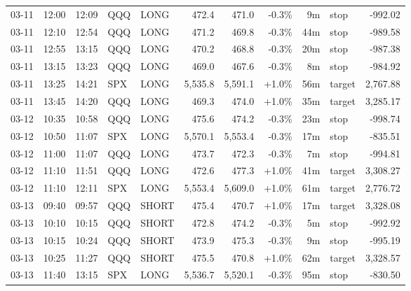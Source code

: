 \documentclass[11pt,a4paper,twoside]{article}
\begin{document}
\begin{center}
\begin{longtable}{>{\color{txtmain}}l l l l l r r r r >{\color{txtmain}}l r}
03-11 & 12:00 & 12:09 & QQQ & LONG & 472.4 & 471.0 & \textcolor{lossred}{-0.3\%} & 9m & stop & \textcolor{lossred}{-992.02} \\
03-11 & 12:10 & 12:54 & QQQ & LONG & 471.2 & 469.8 & \textcolor{lossred}{-0.3\%} & 44m & stop & \textcolor{lossred}{-989.58} \\
03-11 & 12:55 & 13:15 & QQQ & LONG & 470.2 & 468.8 & \textcolor{lossred}{-0.3\%} & 20m & stop & \textcolor{lossred}{-987.38} \\
03-11 & 13:15 & 13:23 & QQQ & LONG & 469.0 & 467.6 & \textcolor{lossred}{-0.3\%} & 8m & stop & \textcolor{lossred}{-984.92} \\
03-11 & 13:25 & 14:21 & SPX & LONG & 5,535.8 & 5,591.1 & \textcolor{wingreen}{+1.0\%} & 56m & target & \textcolor{wingreen}{2,767.88} \\
03-11 & 13:45 & 14:20 & QQQ & LONG & 469.3 & 474.0 & \textcolor{wingreen}{+1.0\%} & 35m & target & \textcolor{wingreen}{3,285.17} \\
03-12 & 10:35 & 10:58 & QQQ & LONG & 475.6 & 474.2 & \textcolor{lossred}{-0.3\%} & 23m & stop & \textcolor{lossred}{-998.74} \\
03-12 & 10:50 & 11:07 & SPX & LONG & 5,570.1 & 5,553.4 & \textcolor{lossred}{-0.3\%} & 17m & stop & \textcolor{lossred}{-835.51} \\
03-12 & 11:00 & 11:07 & QQQ & LONG & 473.7 & 472.3 & \textcolor{lossred}{-0.3\%} & 7m & stop & \textcolor{lossred}{-994.81} \\
03-12 & 11:10 & 11:51 & QQQ & LONG & 472.6 & 477.3 & \textcolor{wingreen}{+1.0\%} & 41m & target & \textcolor{wingreen}{3,308.27} \\
03-12 & 11:10 & 12:11 & SPX & LONG & 5,553.4 & 5,609.0 & \textcolor{wingreen}{+1.0\%} & 61m & target & \textcolor{wingreen}{2,776.72} \\
03-13 & 09:40 & 09:57 & QQQ & SHORT & 475.4 & 470.7 & \textcolor{wingreen}{+1.0\%} & 17m & target & \textcolor{wingreen}{3,328.08} \\
03-13 & 10:10 & 10:15 & QQQ & SHORT & 472.8 & 474.2 & \textcolor{lossred}{-0.3\%} & 5m & stop & \textcolor{lossred}{-992.92} \\
03-13 & 10:15 & 10:24 & QQQ & SHORT & 473.9 & 475.3 & \textcolor{lossred}{-0.3\%} & 9m & stop & \textcolor{lossred}{-995.19} \\
03-13 & 10:25 & 11:27 & QQQ & SHORT & 475.5 & 470.8 & \textcolor{wingreen}{+1.0\%} & 62m & target & \textcolor{wingreen}{3,328.57} \\
03-13 & 11:40 & 13:15 & SPX & LONG & 5,536.7 & 5,520.1 & \textcolor{lossred}{-0.3\%} & 95m & stop & \textcolor{lossred}{-830.50} \\

\end{longtable}
\end{center}
\end{document}
